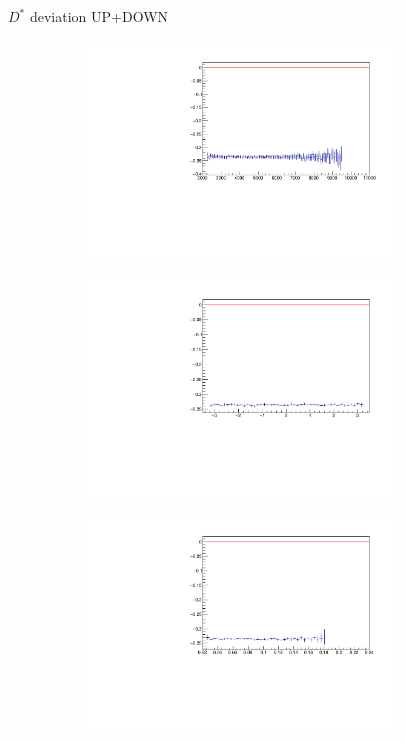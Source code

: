 \documentclass[11pt]{beamer}
\begin{document}
\begin{frame}{$D^*$ deviation UP+DOWN}
\begin{figure}
\begin{subfigure}{0.45\textwidth}
\includegraphics[width=0.9\textwidth]{up_plus_down_pdf/pT_4.pdf}
\end{subfigure}
\begin{subfigure}{0.45\textwidth}
\includegraphics[width=0.9\textwidth]{up_plus_down_pdf/phi_4.pdf}
\end{subfigure}
\begin{subfigure}{0.45\textwidth}
\includegraphics[width=0.9\textwidth]{up_plus_down_pdf/theta_4.pdf}

\end{subfigure}
\end{figure}
\end{frame}
\end{document}
